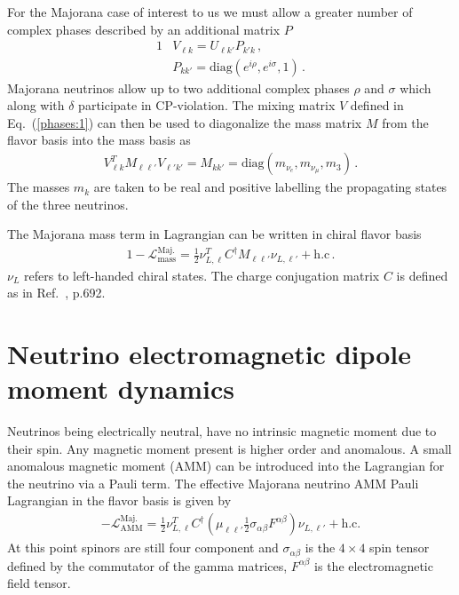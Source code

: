 \documentclass[addchapnum]{ws-rv961x669} %
\newcommand{\req}[1]{Eq.~(\ref{#1})}
\begin{document}
For the Majorana case of interest to us we must allow a greater number of complex phases described by an additional matrix $P$
\begin{alignat}{1}
	\label{phases:1} &V_{\ell k} = U_{\ell k'}P_{k'k}\,,\\
	\label{phases:3} &P_{kk'} = \mathrm{diag}(e^{i\rho},e^{i\sigma},1)\,.
\end{alignat}
Majorana neutrinos allow up to two additional complex phases $\rho$ and $\sigma$ which along with $\delta$ participate in CP-violation. The mixing matrix $V$ defined in \req{phases:1} can then be used to diagonalize the mass matrix $M$ from the flavor basis into the mass basis as
\begin{align}
    \label{diag:1}
    V_{\ell k}^{T}M_{\ell\ell'}V_{\ell'k'} = M_{kk'} = \mathrm{diag}(m_{\nu_{e}},m_{\nu_{\mu}},m_{3})\,.
\end{align}
The masses $m_{k}$ are taken to be real and positive labelling the propagating states of the three neutrinos.

The Majorana mass term in Lagrangian can be written in chiral flavor basis 
\begin{alignat}{1}
	\label{mass:1} -\mathcal{L}_{\mathrm{mass}}^{\mathrm{Maj.}}=\frac{1}{2}\nu_{L,\ell}^{T}C^{\dag}M_{\ell\ell'}\nu_{L,\ell'}+\mathrm{h.c}\,.
\end{alignat}
$\nu_{L}$ refers to left-handed chiral states. The charge conjugation matrix $C$ is defined as in Ref.~\cite{Itzykson:1980rh}, p.692.

\section{Neutrino electromagnetic dipole moment dynamics}
\label{sec:numoment}

Neutrinos being electrically neutral,  have no intrinsic magnetic moment due to their spin. Any magnetic moment present is higher order and anomalous. A small anomalous magnetic moment (AMM) can be introduced into the Lagrangian for the neutrino via a Pauli term. The effective Majorana neutrino AMM Pauli Lagrangian in the flavor basis is given by~\cite{Shrock:1980vy}
\begin{align}
	\label{moment:1} -\mathcal{L}_{\mathrm{AMM}}^\mathrm{Maj.}=\frac{1}{2}\nu_{L,\ell}^{T}C^{\dag}\left(\mu_{\ell\ell'}\frac{1}{2}\sigma_{\alpha\beta}F^{\alpha\beta}\right)\nu_{L,\ell'}+\mathrm{h.c.}
\end{align}
At this point spinors are still four component and $\sigma_{\alpha\beta}$ is the $4\times 4$ spin tensor defined by the commutator of the gamma matrices, $F^{\alpha\beta}$ is the electromagnetic field tensor. 
\end{document}
